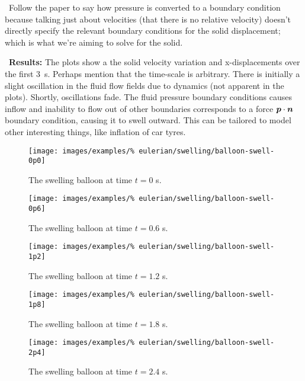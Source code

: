 \textbullet\ Follow the paper to say how pressure is converted to a
boundary condition because talking just about velocities (that there
is no relative velocity) doesn't directly specify the relevant
boundary conditions for the solid displacement; which is what we're
aiming to solve for the solid.

\textbullet\ {\bf Results:} The plots show a the solid velocity
variation and x-displacements over the first 3~s. Perhaps mention that
the time-scale is arbitrary. There is initially a slight oscillation
in the fluid flow fields due to dynamics (not apparent in the
plots). Shortly, oscillations fade. The fluid pressure boundary
conditions causes inflow and inability to flow out of other boundaries
corresponds to a force $\mbox{\boldmath$ p$}\cdot\mbox{\boldmath$ n$}$ boundary condition, causing it to
swell outward. This can be tailored to model other interesting things,
like inflation of car tyres.

\begin{figure}[!hptb]
\centering
\texttt{[image: images/examples/\%
eulerian/swelling/balloon-swell-0p0]}
\caption{The swelling balloon at time $t=0$ s.} 
\label{swelling-balloon-image-0p0}
\end{figure}

\begin{figure}[!hptb]
\centering
\texttt{[image: images/examples/\%
eulerian/swelling/balloon-swell-0p6]}
\caption{The swelling balloon at time $t=0.6$ s.} 
\label{swelling-balloon-image-0p6}
\end{figure}

\begin{figure}[!hptb]
\centering
\texttt{[image: images/examples/\%
eulerian/swelling/balloon-swell-1p2]}
\caption{The swelling balloon at time $t=1.2$ s.} 
\label{swelling-balloon-image-1p2}
\end{figure}

\begin{figure}[!hptb]
\centering
\texttt{[image: images/examples/\%
eulerian/swelling/balloon-swell-1p8]}
\caption{The swelling balloon at time $t=1.8$ s.} 
\label{swelling-balloon-image-1p8}
\end{figure}

\begin{figure}[!hptb]
\centering
\texttt{[image: images/examples/\%
eulerian/swelling/balloon-swell-2p4]}
\caption{The swelling balloon at time $t=2.4$ s.} 
\label{swelling-balloon-image-2p4}
\end{figure}

